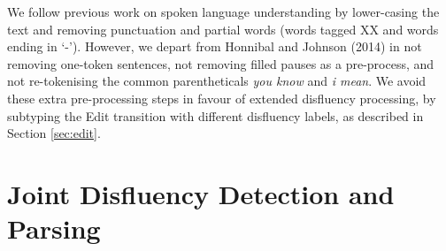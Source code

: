 \documentclass[11pt,letterpaper]{article}
\begin{document}

We follow previous work on spoken language understanding by lower-casing the text
and removing punctuation and partial words (words tagged XX and words ending in
`-').  However, we depart from Honnibal and Johnson (2014) in not removing one-token
sentences, not removing filled pauses as a pre-process, and not
re-tokenising the common parentheticals \emph{you know} and \emph{i mean}.
We avoid these extra pre-processing steps in favour of extended disfluency processing,
by subtyping the Edit transition with different disfluency labels, as described
in Section \ref{sec:edit}.

\section{Joint Disfluency Detection and Parsing}
\label{sec:model}
\end{document}
